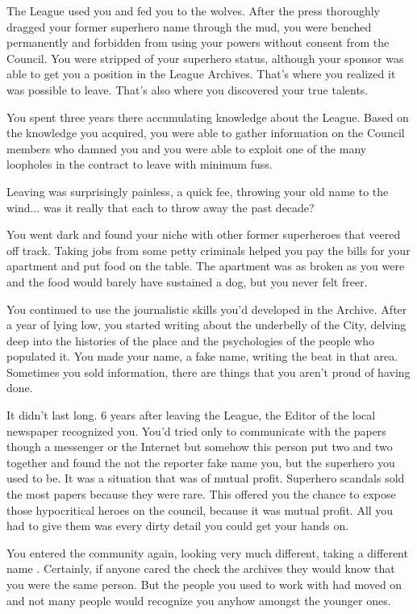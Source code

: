 \documentclass[char]{LRSguildcamp1}
\begin{document}
The League used you and fed you to the wolves. After the press thoroughly dragged your former superhero name through the mud, you were benched permanently and forbidden from using your powers without consent from the Council. You were stripped of your superhero status, although your sponsor was able to get you a position in the League Archives. That's where you realized it was possible to leave. That's also where you discovered your true talents. 

You spent three years there accumulating knowledge about the League. Based on the knowledge you acquired, you were able to gather information on the Council members who damned you and you were able to exploit one of the many loopholes in the contract to leave with minimum fuss.  

Leaving was surprisingly painless, a quick fee, throwing your old name to the wind... was it really that each to throw away the past decade?  

You went dark and found your niche with other former superheroes that veered off track. Taking jobs from some petty criminals helped you pay the bills for your apartment and put food on the table. The apartment was as broken as you were and the food would barely have sustained a dog, but you never felt freer. 

You continued to use the journalistic skills you'd developed in the Archive. After a year of lying low, you started writing about the underbelly of the City, delving deep into the histories of the place and the psychologies of the people who populated it. You made your name, a fake name, writing the beat in that area. Sometimes you sold information, there are things that you aren't proud of having done. 

It didn't last long. 6 years after leaving the League, the Editor of the local newspaper recognized you. You'd tried only to communicate with the papers though a messenger or the Internet but somehow this person put two and two together and found the not the reporter fake name you, but the superhero you used to be. It was a situation that was of mutual profit. Superhero scandals sold the most papers because they were rare. This offered you the chance to expose those hypocritical heroes on the council, because it was mutual profit. All you had to give them was every dirty detail you could get your hands on. 

You entered the community again, looking very much different, taking a different name \cYS{}. Certainly, if anyone cared the check the archives they would know that you were the same person. But the people you used to work with had moved on and not many people would recognize you anyhow amongst the younger ones.  
\end{document}
